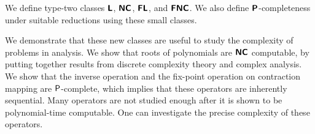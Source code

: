 \documentclass{article}
\theoremstyle{definition}
\theoremstyle{remark}
\begin{document}
We define type-two classes $\text{\bfseries \sffamily \upshape L}$, $\text{\bfseries \sffamily \upshape NC}$, $\text{\bfseries \sffamily \upshape FL}$,
and $\text{\bfseries \sffamily \upshape FNC}$.
We also define $\text{\bfseries \sffamily \upshape P}$-completeness 
under suitable reductions using these small classes.


We demonstrate that these new classes are useful to study the complexity 
of problems in analysis.
We show that roots of polynomials are $\text{\bfseries \sffamily \upshape NC}$ computable,
by putting together results from discrete complexity theory and
 complex analysis.
We show that the inverse operation and the fix-point operation on contraction mapping are $\mathsf{P}$-complete, which implies that these operators are inherently sequential.
Many operators are not studied enough after it is shown to be polynomial-time
computable.
One can investigate the precise complexity of these operators.





\end{document}
